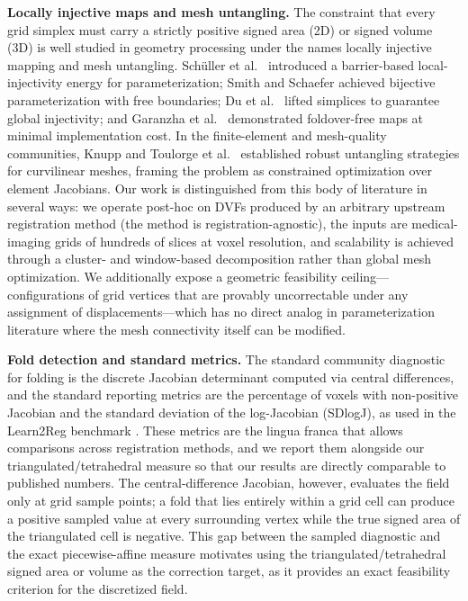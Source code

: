 \textbf{Locally injective maps and mesh untangling.}
The constraint that every grid simplex must carry a strictly positive signed area (2D) or signed volume (3D) is well studied in geometry processing under the names locally injective mapping and mesh untangling. Schüller et al.\ \cite{schuller2013lim} introduced a barrier-based local-injectivity energy for parameterization; Smith and Schaefer \cite{smith2015bijective} achieved bijective parameterization with free boundaries; Du et al.\ \cite{du2020lifting} lifted simplices to guarantee global injectivity; and Garanzha et al.\ \cite{garanzha2021foldfree} demonstrated foldover-free maps at minimal implementation cost. In the finite-element and mesh-quality communities, Knupp \cite{knupp2001untangling} and Toulorge et al.\ \cite{toulorge2013robust} established robust untangling strategies for curvilinear meshes, framing the problem as constrained optimization over element Jacobians. Our work is distinguished from this body of literature in several ways: we operate post-hoc on DVFs produced by an arbitrary upstream registration method (the method is registration-agnostic), the inputs are medical-imaging grids of hundreds of slices at voxel resolution, and scalability is achieved through a cluster- and window-based decomposition rather than global mesh optimization. We additionally expose a geometric feasibility ceiling---configurations of grid vertices that are provably uncorrectable under any assignment of displacements---which has no direct analog in parameterization literature where the mesh connectivity itself can be modified.

\textbf{Fold detection and standard metrics.}
The standard community diagnostic for folding is the discrete Jacobian determinant computed via central differences, and the standard reporting metrics are the percentage of voxels with non-positive Jacobian and the standard deviation of the log-Jacobian (SDlogJ), as used in the Learn2Reg benchmark \cite{learn2reg2023}. These metrics are the lingua franca that allows comparisons across registration methods, and we report them alongside our triangulated/tetrahedral measure so that our results are directly comparable to published numbers. The central-difference Jacobian, however, evaluates the field only at grid sample points; a fold that lies entirely within a grid cell can produce a positive sampled value at every surrounding vertex while the true signed area of the triangulated cell is negative. This gap between the sampled diagnostic and the exact piecewise-affine measure motivates using the triangulated/tetrahedral signed area or volume as the correction target, as it provides an exact feasibility criterion for the discretized field.

